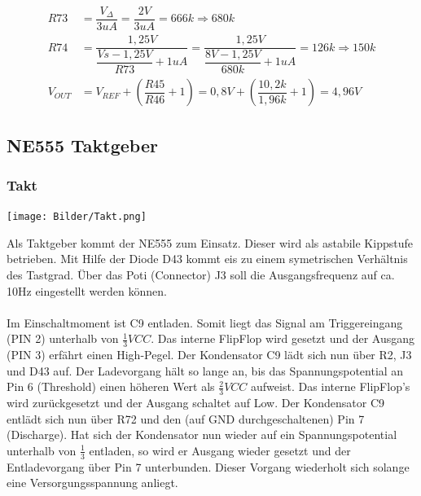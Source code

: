 \documentclass[a4paper,11pt]{scrartcl}
\begin{document}
\begin{center}
\begin{align}
	R73 &= \dfrac{V_{\Delta}}{3uA} = \dfrac{2V}{3uA} = 666k  \Rightarrow 680k\\
	R74 &= \dfrac{1,25V}{\dfrac{Vs - 1,25V}{R73} + 1uA} = \dfrac{1,25V}{\dfrac{8V - 1,25V}{680k} + 1uA} = 126k \Rightarrow 150k	\\
	V_{OUT}	&= V_{REF} + (\dfrac{R45}{R46} + 1) = 0,8V + (\dfrac{10,2k}{1,96k} + 1) = 4,96V
\end{align}
\end{center}


\newpage


\subsection{NE555 Taktgeber}

\subsubsection{Takt}

\begin{center}
\texttt{[image: Bilder/Takt.png]}
\end{center}

Als Taktgeber kommt der \glqq NE555 \grqq{} zum Einsatz. Dieser wird als astabile Kippstufe betrieben. Mit Hilfe der Diode D43 kommt eis zu einem symetrischen Verhältnis des Tastgrad. Über das Poti (Connector) J3 soll die Ausgangsfrequenz auf ca. 10Hz eingestellt werden können. 
\\
\\
Im Einschaltmoment ist C9 entladen. Somit liegt das Signal am Triggereingang (PIN 2) unterhalb von $\frac{1}{3} VCC$. Das interne FlipFlop wird gesetzt und der Ausgang (PIN 3) erfährt einen High-Pegel. Der Kondensator C9 lädt sich nun über R2, J3 und D43 auf. Der Ladevorgang hält so lange an, bis das Spannungspotential an Pin 6 (Threshold) einen höheren Wert als $\frac{2}{3} VCC$ aufweist. Das interne FlipFlop's wird zurückgesetzt und der Ausgang schaltet auf Low. Der Kondensator C9 entlädt sich nun über R72 und den (auf GND durchgeschaltenen) Pin 7 (Discharge). Hat sich der Kondensator nun wieder auf ein Spannungspotential unterhalb von $\frac{1}{3}$ entladen, so wird er Ausgang wieder gesetzt und der Entladevorgang über Pin 7 unterbunden. Dieser Vorgang wiederholt sich solange eine Versorgungsspannung anliegt. 
\end{document}
